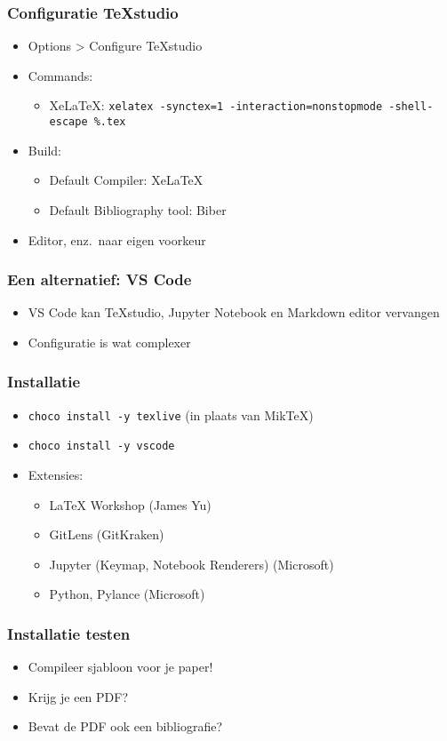 \documentclass[aspectratio=169]{beamer}
\begin{document}
\begin{frame}
  \frametitle{Configuratie TeXstudio}

  \begin{itemize}
    \item Options > Configure TeXstudio
    \item Commands:
          \begin{itemize}
            \item XeLaTeX\@: \texttt{xelatex -synctex=1 -interaction=nonstopmode -shell-escape \%.tex}
          \end{itemize}
    \item Build:
          \begin{itemize}
            \item Default Compiler: XeLaTeX
            \item Default Bibliography tool: Biber
          \end{itemize}
    \item Editor, enz.\ naar eigen voorkeur
  \end{itemize}
\end{frame}

\begin{frame}
  \frametitle{Een alternatief: VS Code}

  \begin{itemize}
    \item VS Code kan {\TeX}studio, Jupyter Notebook en Markdown editor vervangen
    \item Configuratie is wat complexer
  \end{itemize}
\end{frame}

\begin{frame}
  \frametitle{Installatie}

  \begin{itemize}
    \item \texttt{choco install -y texlive}  (in plaats van Mik{\TeX})
    \item \texttt{choco install -y vscode}
    \item Extensies:
          \begin{itemize}
            \item {\LaTeX} Workshop (James Yu)
            \item GitLens (GitKraken)
            \item Jupyter (Keymap, Notebook Renderers) (Microsoft)
            \item Python, Pylance (Microsoft)
          \end{itemize}
  \end{itemize}
\end{frame}

\begin{frame}
  \frametitle{Installatie testen}

  \begin{itemize}
    \item Compileer sjabloon voor je paper!
    \item Krijg je een PDF?
    \item Bevat de PDF ook een bibliografie?
  \end{itemize}
\end{frame}
\end{document}
